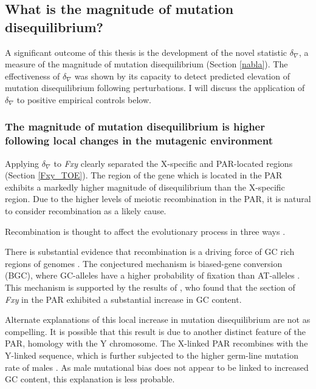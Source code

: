 \subsection{What is the magnitude of mutation disequilibrium?}

A significant outcome of this thesis is the development of the novel statistic $\delta_\nabla$, a measure of the magnitude of mutation disequilibrium (Section \ref{nabla}). The effectiveness of $\delta_\nabla$ was shown by its capacity to detect predicted elevation of mutation disequilibrium following perturbations. I will discuss the application of $\delta_\nabla$ to positive empirical controls below.  

\subsubsection{The magnitude of mutation disequilibrium is higher following local changes in the mutagenic environment}

Applying $\delta_\nabla$ to \textit{Fxy} clearly separated the X-specific and PAR-located regions (Section \ref{Fxy_TOE}). The region of the gene which is located in the PAR exhibits a markedly higher magnitude of disequilibrium than the X-specific region. Due to the higher levels of meiotic recombination in the PAR, it is natural to consider recombination as a likely cause. 

Recombination is thought to affect the evolutionary process in three ways \citep{Galtier2004RecombinationParadox}. 

There is substantial evidence that recombination is a driving force of GC rich regions of genomes \citep{Meunier2004RecombinationGenome, Berglund2009HotspotsGenes,Galtier2009GC-biasedPrimates}. The conjectured mechanism is biased-gene conversion (BGC), where GC-alleles have a higher probability of fixation than AT-alleles \citep{Eyre-Walker1999EvidenceDNA., Mancera2008High-resolutionYeast}. This mechanism is supported by the results of \cite{Montoya-Burgos2003RecombinationGenomes}, who found that the section of \textit{Fxy} in the PAR exhibited a substantial increase in GC content.

Alternate explanations of this local increase in mutation disequilibrium are not as compelling. It is possible that this result is due to another distinct feature of the PAR, homology with the Y chromosome. The X-linked PAR recombines with the Y-linked sequence, which is further subjected to the higher germ-line mutation rate of males \citep{Huttley2000HowMutagenesis}. As male mutational bias does not appear to be linked to increased GC content, this explanation is less probable. 

